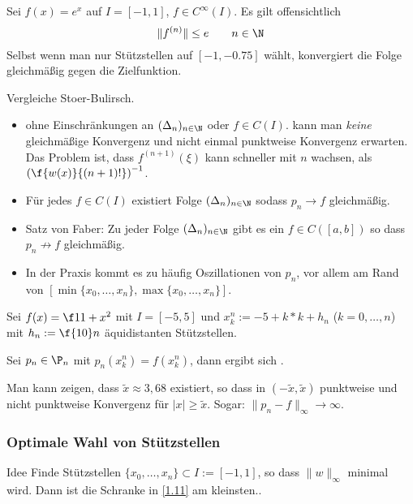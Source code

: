 \documentclass[a4paper,11pt]{scrartcl}
\begin{document}
\begin{ex*}
	Sei $f(x)=e^x$ auf $I=[-1,1]$, $f\in C^\infty(I)$.
	Es gilt offensichtlich
	\[
		\|f^{(n)}\| \le e \qquad n\in \N
	\]
	Selbst wenn man nur Stützstellen auf $[-1,-0.75]$ wählt, konvergiert die Folge gleichmäßig gegen die Zielfunktion.
\end{ex*}

\begin{note}
	Vergleiche Stoer-Bulirsch.
	\begin{itemize}
		\item
			ohne Einschränkungen an $(\Delta_n)_{n\in \N}$ oder $f\in C(I)$. kann man \emph{keine} gleichmäßige Konvergenz und nicht einmal punktweise Konvergenz erwarten.
			Das Problem ist, dass $f^{(n+1)}(\xi)$ kann schneller mit $n$ wachsen, als $\left(\f {w(x)}{(n+1)!}\right)^{-1}$.	
		\item
			Für jedes $f\in C(I)$ existiert Folge $(\Delta_n)_{n\in \N}$ sodass $p_n\to f$ gleichmäßig.
		\item
			Satz von Faber: Zu jeder Folge $(\Delta_n)_{n\in \N}$ gibt es ein $f\in C([a,b])$ so dass $p_n\not\to f$ gleichmäßig.
		\item
			In der Praxis kommt es zu häufig Oszillationen von $p_n$, vor allem am Rand von $[\min\{x_0,\dotsc, x_n\},\max\{x_0,\dotsc,x_n\}]$.
	\end{itemize}
\end{note}

\begin{ex*}[Runge]
	Sei $f(x)= \f 1{1+x^2}$ mit $I=[-5,5]$ und $x_k^n := -5+k*k+h_n$ ($k=0,\dotsc,n$) mit $h_n:= \f {10}n$ äquidistanten Stützstellen.

	Sei $p_n\in \P_n$ mit $p_n(x_k^n) = f(x_k^n)$, dann ergibt sich \fixme[Oszillationen].
	
	Man kann zeigen, dass $\tilde x \approx 3,68$ existiert, so dass in $(-\tilde x,\tilde x)$ punktweise und nicht punktweise Konvergenz für $|x|\ge \tilde x$. Sogar: $\|p_n-f\|_\infty \to \infty$.
\end{ex*}

\subsubsection{Optimale Wahl von Stützstellen}

\begin{seg}{Idee}
Finde Stützstellen $\{x_0,\dotsc,x_n\}\subset I := [-1,1]$, so dass $\|w\|_\infty$ minimal wird.
Dann ist die Schranke in \ref{1.11} am kleinsten..
\end{seg}
\end{document}
